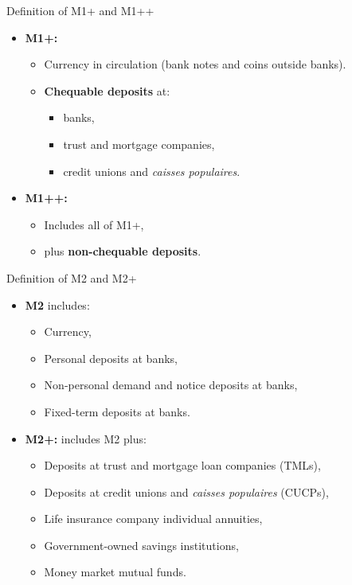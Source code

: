 \documentclass[aspectratio=169]{beamer}
\begin{document}
\begin{frame}{Definition of M1+ and M1++}
\transfade
\begin{itemize}
  \item \textbf{M1+:}
  \begin{itemize}
    \item Currency in circulation (bank notes and coins outside banks).
    \item \textbf{Chequable deposits} at:
    \begin{itemize}
      \item banks,
      \item trust and mortgage companies,
      \item credit unions and \emph{caisses populaires}.
    \end{itemize}
  \end{itemize}
  \item \textbf{M1++:}
  \begin{itemize}
    \item Includes all of M1+,
    \item plus \textbf{non-chequable deposits}.
  \end{itemize}
\end{itemize}
\end{frame}

\begin{frame}{Definition of M2 and M2+}
\transfade
\begin{itemize}
  \item \textbf{M2} includes:
  \begin{itemize}
    \item Currency,
    \item Personal deposits at banks,
    \item Non-personal demand and notice deposits at banks,
    \item Fixed-term deposits at banks.
  \end{itemize}
  \item \textbf{M2+:} includes M2 plus:
  \begin{itemize}
    \item Deposits at trust and mortgage loan companies (TMLs),
    \item Deposits at credit unions and \emph{caisses populaires} (CUCPs),
    \item Life insurance company individual annuities,
    \item Government-owned savings institutions,
    \item Money market mutual funds.
  \end{itemize}
\end{itemize}
\end{frame}
\end{document}
